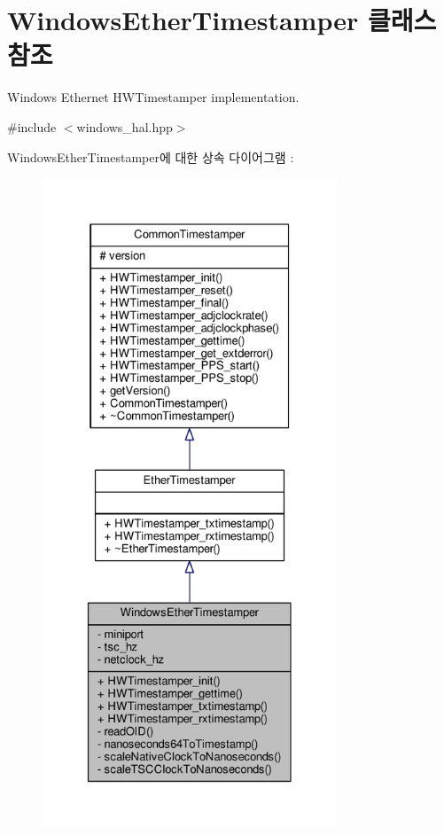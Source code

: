 \hypertarget{class_windows_ether_timestamper}{}\section{Windows\+Ether\+Timestamper 클래스 참조}
\label{class_windows_ether_timestamper}


Windows Ethernet H\+W\+Timestamper implementation.  




{\ttfamily \#include $<$windows\+\_\+hal.\+hpp$>$}



Windows\+Ether\+Timestamper에 대한 상속 다이어그램 \+: 
\nopagebreak
\begin{figure}[H]
\begin{center}
\leavevmode
\includegraphics[height=550pt]{class_windows_ether_timestamper__inherit__graph}
\end{center}
\end{figure}


